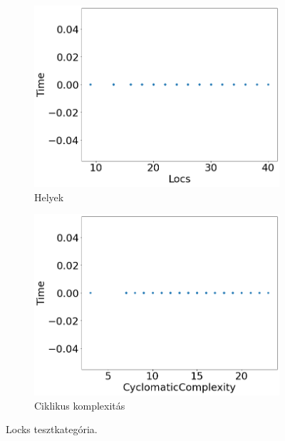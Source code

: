 \begin{figure}[ht]
\begin{subfigure}[b]{0.5\linewidth}
		\includegraphics[width=0.95\linewidth]{figures/locks/locs.png} 
		\caption{Helyek} 
	\end{subfigure}%
	\begin{subfigure}[b]{0.5\linewidth}
		\centering
		\includegraphics[width=0.95\linewidth]{figures/locks/cc.png} 
		\caption{Ciklikus komplexitás} 
	\end{subfigure} 
	\caption{Locks tesztkategória.\label{fig:locks} }
\end{figure}

